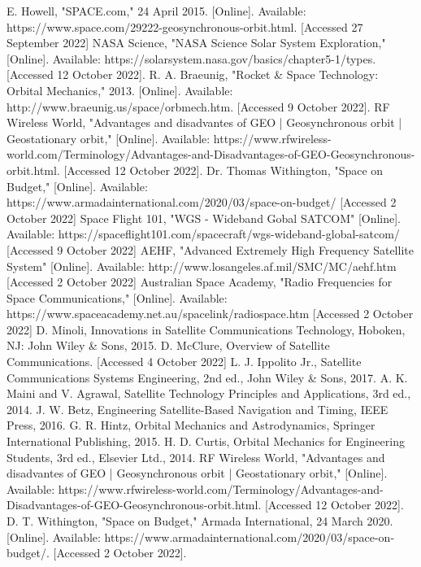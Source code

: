 \documentclass[conference]{IEEEtran}
\begin{document}
\begin{thebibliography}{00}
 E. Howell, "SPACE.com," 24 April 2015. [Online]. Available: https://www.space.com/29222-geosynchronous-orbit.html. [Accessed 27 September 2022]
 NASA Science, "NASA Science Solar System Exploration," [Online]. Available: https://solarsystem.nasa.gov/basics/chapter5-1/types. [Accessed 12 October 2022].
 R. A. Braeunig, "Rocket \& Space Technology: Orbital Mechanics," 2013. [Online]. Available: http://www.braeunig.us/space/orbmech.htm. [Accessed 9 October 2022].
 RF Wireless World, "Advantages and disadvantes of GEO | Geosynchronous orbit | Geostationary orbit," [Online]. Available: https://www.rfwireless-world.com/Terminology/Advantages-and-Disadvantages-of-GEO-Geosynchronous-orbit.html. [Accessed 12 October 2022].
 Dr. Thomas Withington, "Space on Budget," [Online]. Available: https://www.armadainternational.com/2020/03/space-on-budget/ [Accessed 2 October 2022]
 Space Flight 101, "WGS - Wideband Gobal SATCOM" [Online]. Available: https://spaceflight101.com/spacecraft/wgs-wideband-global-satcom/ [Accessed 9 October 2022]
 AEHF, "Advanced Extremely High Frequency Satellite System" [Online]. Available: http://www.losangeles.af.mil/SMC/MC/aehf.htm [Accessed 2 October 2022]
 Australian Space Academy, "Radio Frequencies for Space Communications," [Online]. Available: https://www.spaceacademy.net.au/spacelink/radiospace.htm [Accessed 2 October 2022]
 D. Minoli, Innovations in Satellite Communications Technology, Hoboken, NJ: John Wiley \& Sons, 2015.
 D. McClure, Overview of Satellite Communications. [Accessed 4 October 2022]
 L. J. Ippolito Jr., Satellite Communications Systems Engineering, 2nd ed., John Wiley \& Sons, 2017.
 A. K. Maini and V. Agrawal, Satellite Technology Principles and Applications, 3rd ed., 2014.
 J. W. Betz, Engineering Satellite-Based Navigation and Timing, IEEE Press, 2016.
 G. R. Hintz, Orbital Mechanics and Astrodynamics, Springer International Publishing, 2015.
 H. D. Curtis, Orbital Mechanics for Engineering Students, 3rd ed., Elsevier Ltd., 2014. 
 RF Wireless World, "Advantages and disadvantes of GEO | Geosynchronous orbit | Geostationary orbit," [Online]. Available: https://www.rfwireless-world.com/Terminology/Advantages-and-Disadvantages-of-GEO-Geosynchronous-orbit.html. [Accessed 12 October 2022].
 D. T. Withington, "Space on Budget," Armada International, 24 March 2020. [Online]. Available: https://www.armadainternational.com/2020/03/space-on-budget/. [Accessed 2 October 2022].
\end{thebibliography}
\end{document}
